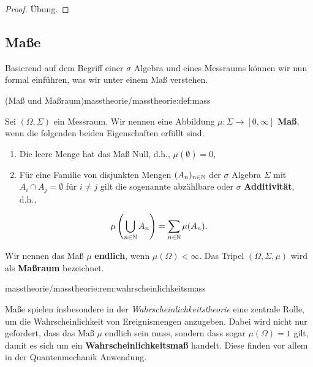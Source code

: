 \begin{proof}
 Übung.
\end{proof}


\subsection{Maße}
\label{\detokenize{masstheorie/masstheorie:masze}}
\par
Basierend auf dem Begriff einer \(\sigma\) Algebra und eines Messraums können wir nun formal einführen, was wir unter einem Maß verstehen.
\begin{definition}{(Maß und Maßraum)}{masstheorie/masstheorie:def:mass}



\par
Sei \((\Omega, \Sigma)\) ein Messraum.
Wir nennen eine Abbildung \(\mu: \Sigma\to [0, \infty]\) \textbf{Maß}, wenn die folgenden beiden Eigenschaften erfüllt sind.
\begin{enumerate}

\item {} 
\par
Die leere Menge hat das Maß Null, d.h., \(\mu(\emptyset) = 0\),

\item {} 
\par
Für eine Familie von disjunkten Mengen \((A_n)_{n\in\mathbb{N}}\) der \(\sigma\) Algebra \(\Sigma\) mit \(A_i \cap A_j = \emptyset\) für \(i \neq j\) gilt die sogenannte abzählbare oder \(\sigma\) \textbf{Additivität}, d.h.,

\end{enumerate}
\begin{align*}
\mu\left( \bigcup_{n\in\mathbb{N}}A_n \right) = \sum_{n\in\mathbb{N}}\mu (A_n).
\end{align*}
\par
Wir nennen das Maß \(\mu\) \textbf{endlich}, wenn \(\mu(\Omega)<\infty\).
Das Tripel \((\Omega, \Sigma, \mu)\) wird als \textbf{Maßraum} bezeichnet.
\end{definition}
\begin{remark}{}{masstheorie/masstheorie:rem:wahrscheinlichkeitsmass}



\par
Maße spielen insbesondere in der \emph{Wahrscheinlichkeitstheorie} eine zentrale Rolle, um die Wahrscheinlichkeit von Ereignismengen anzugeben.
Dabei wird nicht nur gefordert, dass das Maß \(\mu\) endlich sein muss, sondern dass sogar \(\mu(\Omega)=1\) gilt, damit es sich um ein \textbf{Wahrscheinlichkeitsmaß} handelt.
Diese finden vor allem in der Quantenmechanik Anwendung.
\end{remark}


